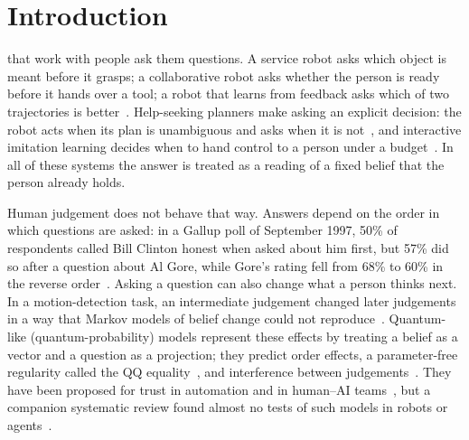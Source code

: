 \section{Introduction}\label{sec:intro}
 that work with people ask them questions. A service robot asks which object is meant before it grasps; a collaborative robot asks whether the person is ready before it hands over a tool; a robot that learns from feedback asks which of two trajectories is better~\cite{Christiano2017}. Help-seeking planners make asking an explicit decision: the robot acts when its plan is unambiguous and asks when it is not~\cite{Ren2023,Yuan2026}, and interactive imitation learning decides when to hand control to a person under a budget~\cite{Hoque2021}. In all of these systems the answer is treated as a reading of a fixed belief that the person already holds.

Human judgement does not behave that way. Answers depend on the order in which questions are asked: in a Gallup poll of September 1997, 50\% of respondents called Bill Clinton honest when asked about him first, but 57\% did so after a question about Al Gore, while Gore's rating fell from 68\% to 60\% in the reverse order~\cite{Moore2002}. Asking a question can also change what a person thinks next. In a motion-detection task, an intermediate judgement changed later judgements in a way that Markov models of belief change could not reproduce~\cite{Kvam2015,Busemeyer2019}. Quantum-like (quantum-probability) models represent these effects by treating a belief as a vector and a question as a projection; they predict order effects, a parameter-free regularity called the QQ equality~\cite{Wang2013b,Wang2014}, and interference between judgements~\cite{Busemeyer2012,Pothos2013a,Pothos2022}. They have been proposed for trust in automation and in human--AI teams~\cite{Roeder2023,Humr2023,Lawless2020}, but a companion systematic review found almost no tests of such models in robots or agents~\cite{Guru2026b}.

